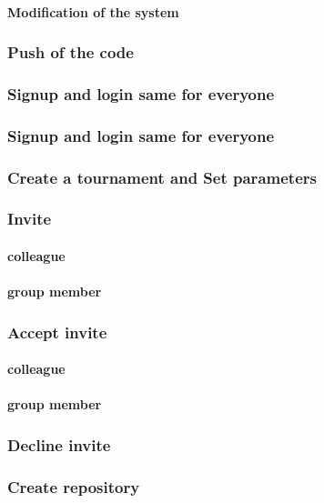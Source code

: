 \documentclass{article}
\begin{document}
        \paragraph*{Modification of the system}
            \subsubsection{Push of the code}
            \subsubsection{Signup and login same for everyone}
            \subsubsection{Signup and login same for everyone}
            \subsubsection{Create a tournament and Set parameters}
            \subsubsection{Invite}
                \paragraph*{colleague}

                \paragraph*{group member}
            \subsubsection{Accept invite}
                \paragraph*{colleague}

                \paragraph*{group member}
            \subsubsection{Decline invite}
            \subsubsection{Create repository}
\end{document}
